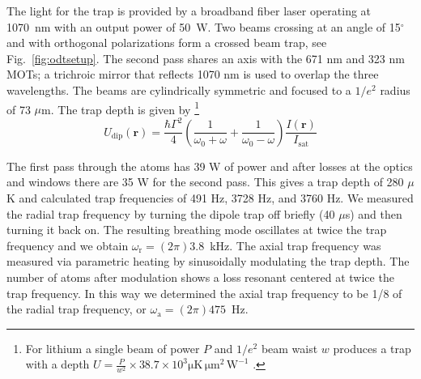 \documentclass[oneside,12pt]{memoir}
\newcommand{\isat}{ \ensuremath{ I_{\mathrm{sat}} } }
\begin{document}
The light for the trap is provided by a broadband fiber laser operating at
1070~nm with an output power of 50~W.  Two beams crossing at an angle of
15$^{\circ}$ and with orthogonal polarizations form a crossed beam trap, see
Fig.~\ref{fig:odtsetup}.   The second pass shares an axis with the 671 nm and
323 nm MOTs; a trichroic mirror that reflects 1070 nm is used to overlap the
three wavelengths.  The beams are cylindrically symmetric and focused to a
$1/e^{2}$ radius of 73 $\mu$m.   The trap depth is given by \footnote{For
lithium a single beam of power $P$ and $1/e^{2}$ beam waist $w$ produces a
trap with a depth $U=\frac{P}{w^{2}} \times 38.7\times10^{3}  \mathrm{\mu K\,
\mu m^{2}\, W^{-1}} $ .} \[ U_{\mathrm{dip}}(\mathrm{\mathbf{r}} ) =
\frac{\hbar \Gamma^{2}}{4} \left( \frac{1}{\omega_{0}+\omega} +
\frac{1}{\omega_{0}-\omega} \right) \frac{I(\mathrm{\mathbf{r}} )}{\isat} \] 

The first pass through the atoms has 39 W of power and after losses at the
optics and windows there are 35 W for the second pass.  This gives a trap depth
of 280 $\mu$K and calculated trap frequencies of 491 Hz, 3728 Hz, and 3760 Hz.
We measured the radial trap frequency by turning the dipole trap off briefly
(40 $\mu$s) and then turning it back on. The resulting breathing mode
oscillates at twice the trap frequency and we obtain $\omega_{\mathrm{r}} =
(2\pi)3.8$~kHz.   The axial trap frequency was measured via parametric heating
by sinusoidally modulating the trap depth.  The number of atoms after
modulation shows a loss  resonant centered at twice the trap frequency.   In
this way we determined the axial trap frequency to be 1/8 of the radial trap
frequency, or $\omega_{\mathrm{a}} = (2\pi)475$~Hz.  
\end{document}
